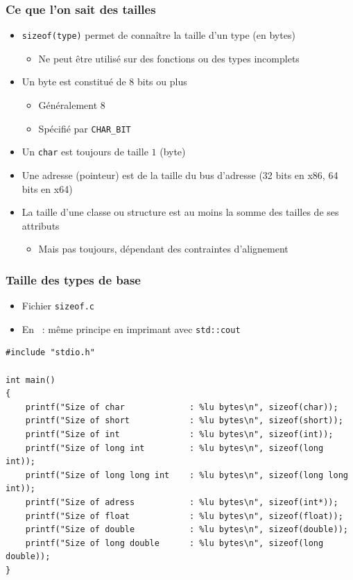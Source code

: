 \begin{frame}
\frametitle{Ce que l'on sait des tailles}
\begin{itemize}[<+->]
\item \lstinline|sizeof(type)| permet de connaître la taille d'un type (en bytes)
	\begin{itemize}
	\item Ne peut être utilisé sur des fonctions ou des types incomplets
	\end{itemize}
\item Un byte est constitué de $8$ bits ou plus
	\begin{itemize}
	\item Généralement $8$
	\item Spécifié par \texttt{CHAR\_BIT}
	\end{itemize}
\item Un \lstinline|char| est toujours de taille $1$ (byte)
\item Une adresse (pointeur) est de la taille du bus d'adresse (32 bits en x86, 64 bits en x64)
\item La taille d'une classe ou structure est au moins la somme des tailles de ses attributs
	\begin{itemize}
	\item Mais pas toujours, dépendant des contraintes d'alignement
	\end{itemize}
\end{itemize}
\end{frame}

\begin{frame}[containsverbatim]
\frametitle{Taille des types de base}
\begin{itemize}
\item Fichier \texttt{sizeof.c}
\item En \cpp\ : même principe en imprimant avec \texttt{std::cout}
\end{itemize}
\begin{lstlisting}
#include "stdio.h"

int main()
{
	printf("Size of char             : %lu bytes\n", sizeof(char));
	printf("Size of short            : %lu bytes\n", sizeof(short));
	printf("Size of int              : %lu bytes\n", sizeof(int));
	printf("Size of long int         : %lu bytes\n", sizeof(long int));
	printf("Size of long long int    : %lu bytes\n", sizeof(long long int));
	printf("Size of adress           : %lu bytes\n", sizeof(int*));
	printf("Size of float            : %lu bytes\n", sizeof(float));
	printf("Size of double           : %lu bytes\n", sizeof(double));
	printf("Size of long double      : %lu bytes\n", sizeof(long double));
}
\end{lstlisting}
\end{frame}

